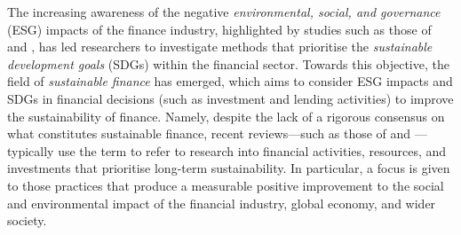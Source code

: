 \documentclass[a4paper, 11pt]{report}
\begin{document}
    The increasing awareness of the negative \emph{environmental, social, and governance} (ESG) impacts of the finance industry, highlighted by studies such as those of \citet{power-2020} and \citet{greenpeace-2021}, has led researchers to investigate methods that prioritise the \emph{sustainable development goals} (SDGs) within the financial sector. Towards this objective, the field of \emph{sustainable finance} has emerged, which aims to consider ESG impacts and SDGs in financial decisions (such as investment and lending activities) to improve the sustainability of finance. Namely, despite the lack of a rigorous consensus on what constitutes sustainable finance, recent reviews---such as those of \citet{cunha-2021} and \citet{kumar-2022}---typically use the term to refer to research into financial activities, resources, and investments that prioritise long-term sustainability. In particular, a focus is given to those practices that produce a measurable positive improvement to the social and environmental impact of the financial industry, global economy, and wider society. 
\end{document}
